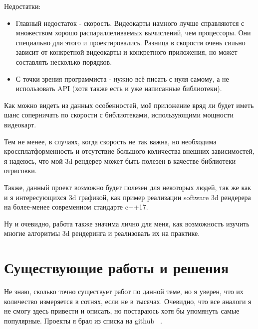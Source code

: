 \documentclass[12pt]{article}
\begin{document}
Недостатки:
\begin{itemize}
	\item Главный недостаток - скорость. Видеокарты намного лучше справляются с множеством хорошо распараллеливаемых вычислений, чем процессоры. Они специально для этого и проектировались. Разница в скорости очень сильно зависит от конкретной видеокарты и конкретного приложения, но может составлять несколько порядков.
	\item С точки зрения программиста - нужно всё писать с нуля самому, а не использовать API (хотя также есть и уже написанные библиотеки).
\end{itemize}

Как можно видеть из данных особенностей, моё приложение вряд ли будет иметь шанс соперничать по скорости с библиотеками, использующими мощности видеокарт. 

Тем не менее, в случаях, когда скорость не так важна, но необходима кроссплатформенность и отсутствие большого количества внешних зависимостей, я надеюсь, что мой 3d рендерер может быть полезен в качестве библиотеки отрисовки.

Также, данный проект возможно будет полезен для некоторых людей, так же как и я интересующихся 3d графикой, как пример реализации software 3d рендерера на более-менее современном стандарте c++17.

Ну и очевидно, работа также значима лично для меня, как возможность изучить многие алгоритмы 3d рендеринга и реализовать их на практике.

\section{Существующие работы и решения}
Не знаю, сколько точно существует работ по данной теме, но я уверен, что их количество измеряется в сотнях, если не в тысячах. Очевидно, что все аналоги я не смогу здесь привести и описать, но постараюсь хотя бы упомянуть самые популярные. Проекты я брал из списка на github ~\cite{analogsList}.
\end{document}
